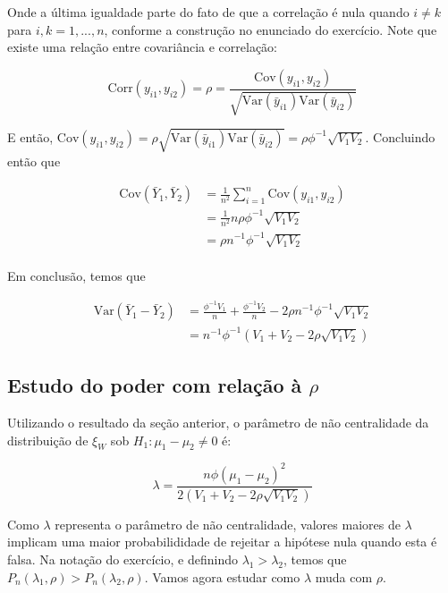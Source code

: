 \documentclass[
  11pt,
]{article}
\begin{document}
Onde a última igualdade parte do fato de que a correlação é nula quando \(i \ne k\) para \(i,k = 1, ..., n\), conforme a construção no enunciado do exercício. Note que existe uma relação entre covariância e correlação:

\[
\text{Corr} \left(  y_{i1} , y_{i2} \right) = \rho= \frac{\text{Cov} \left(  y_{i1} , y_{i2} \right)}{\sqrt{\text{Var}(\bar y_{i1})\text{Var}(\bar y_{i2})}}
\]

E então, \(\text{Cov} \left( y_{i1} , y_{i2} \right) = \rho\sqrt{\text{Var}(\bar y_{i1})\text{Var}(\bar y_{i2})} = \rho\phi^{-1}\sqrt{V_1V_2}\). Concluindo então que

\begin{align*}
\text{Cov}(\bar Y_1 , \bar Y_2) 
&=   \frac{1}{n^2}  \sum^{n}_{i=1} \text{Cov} \left(  y_{i1} , y_{i2} \right) \\
&=   \frac{1}{n^2}  n \rho\phi^{-1}\sqrt{V_1V_2} \\
&=  \rho n^{-1}\phi^{-1}\sqrt{V_1V_2} \\
\end{align*}

Em conclusão, temos que

\begin{align*}
\text{Var}(\bar Y_1 - \bar Y_2) 
&= \frac{\phi^{-1}V_1}{n} + \frac{\phi^{-1}V_2}{n} - 2\rho n^{-1}\phi^{-1}\sqrt{V_1V_2} \\
&= n^{-1}\phi^{-1} \left( V_1 + V_2 - 2 \rho \sqrt{V_1 V_2} \right)
\end{align*}

\hypertarget{estudo-do-poder-com-relauxe7uxe3o-uxe0-rho}{%
\subsection{\texorpdfstring{Estudo do poder com relação à \(\rho\)}{Estudo do poder com relação à \textbackslash rho}}\label{estudo-do-poder-com-relauxe7uxe3o-uxe0-rho}}

Utilizando o resultado da seção anterior, o parâmetro de não centralidade da distribuição de \(\xi_W\) sob \(H_1: \mu_1 - \mu_2 \ne 0\) é:

\[
\lambda = \frac{n \phi (\mu_1 - \mu_2 )^2}{2 \left(   V_1 + V_2 - 2 \rho \sqrt{V_1 V_2}  \right)}
\]

Como \(\lambda\) representa o parâmetro de não centralidade, valores maiores de \(\lambda\) implicam uma maior probabilididade de rejeitar a hipótese nula quando esta é falsa. Na notação do exercício, e definindo \(\lambda_1 > \lambda_2\), temos que \(P_n(\lambda_1, \rho) > P_n(\lambda_2, \rho)\). Vamos agora estudar como \(\lambda\) muda com \(\rho\).
\end{document}
